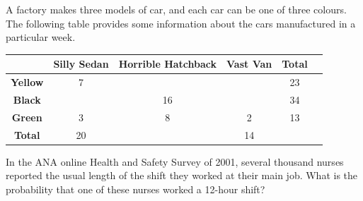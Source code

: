 \begin{questions}
  \question A factory makes three models of car, and each car can be one of three colours. The
            following table provides some information about the cars manufactured in a particular week.

            \begin{tabular}{|c|c|c|c|c|c|}\hline
              & \textbf{Silly Sedan} & \textbf{Horrible Hatchback} & \textbf{Vast Van} & \textbf{Total}\\\hline
              \textbf{Yellow} & 7 & & & 23\\\hline
              \textbf{Black} & & 16 & & 34\\\hline
              \textbf{Green} & 3 & 8 & 2 & 13\\\hline
              \textbf{Total} & 20 & & 14 &\ \\\hline
            \end{tabular}
  \question In the ANA online Health and Safety Survey of 2001, several thousand nurses reported the
            usual length of the shift they worked at their main job. What is the probability that one of
            these nurses worked a 12-hour shift?


\end{questions}
